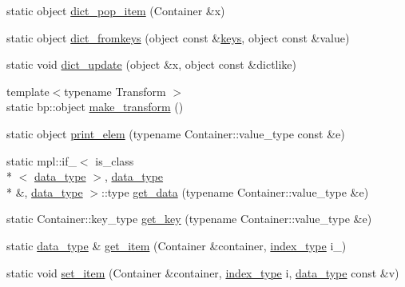 \begin{DoxyCompactItemize}
static object \hyperlink{classboost_1_1python_1_1std__map__indexing__suite_af207a28bb4d4a7fa8364139dd0484a84}{dict\-\_\-pop\-\_\-item} (Container \&x)
\item 
static object \hyperlink{classboost_1_1python_1_1std__map__indexing__suite_a8aedb678ae655adaf30a5f0200fdeda9}{dict\-\_\-fromkeys} (object const \&\hyperlink{classboost_1_1python_1_1std__map__indexing__suite_a1d08ce35eb71bc9248f64a515d6d9775}{keys}, object const \&value)
\item 
static void \hyperlink{classboost_1_1python_1_1std__map__indexing__suite_a77daf7a1f7b0da0d6035e91dfa118899}{dict\-\_\-update} (object \&x, object const \&dictlike)
\item 
{\footnotesize template$<$typename Transform $>$ }\\static bp\-::object \hyperlink{classboost_1_1python_1_1std__map__indexing__suite_ad2e6c20740dd4ad7058f04e958fc499c}{make\-\_\-transform} ()
\item 
static object \hyperlink{classboost_1_1python_1_1std__map__indexing__suite_a1147c134bf910497fb9a467a21522933}{print\-\_\-elem} (typename Container\-::value\-\_\-type const \&e)
\item 
static mpl\-::if\-\_\-$<$ is\-\_\-class\\*
$<$ \hyperlink{classboost_1_1python_1_1std__map__indexing__suite_a3e9a6a8b8ba34759cf0ba99fe5966041}{data\-\_\-type} $>$, \hyperlink{classboost_1_1python_1_1std__map__indexing__suite_a3e9a6a8b8ba34759cf0ba99fe5966041}{data\-\_\-type} \\*
\&, \hyperlink{classboost_1_1python_1_1std__map__indexing__suite_a3e9a6a8b8ba34759cf0ba99fe5966041}{data\-\_\-type} $>$\-::type \hyperlink{classboost_1_1python_1_1std__map__indexing__suite_a7c13569acfb66f1adb8d92c581091654}{get\-\_\-data} (typename Container\-::value\-\_\-type \&e)
\item 
static Container\-::key\-\_\-type \hyperlink{classboost_1_1python_1_1std__map__indexing__suite_a28a13c6039a1305e3605c6ca3a9803d9}{get\-\_\-key} (typename Container\-::value\-\_\-type \&e)
\item 
static \hyperlink{classboost_1_1python_1_1std__map__indexing__suite_a3e9a6a8b8ba34759cf0ba99fe5966041}{data\-\_\-type} \& \hyperlink{classboost_1_1python_1_1std__map__indexing__suite_a8650d42e8d1d7e095f6cfc9e664f0fab}{get\-\_\-item} (Container \&container, \hyperlink{classboost_1_1python_1_1std__map__indexing__suite_a4b2ac75883fba93dbca6d9e83197c842}{index\-\_\-type} i\-\_\-)
\item 
static void \hyperlink{classboost_1_1python_1_1std__map__indexing__suite_a5dc3dd492671db19152e7c64b62e9f97}{set\-\_\-item} (Container \&container, \hyperlink{classboost_1_1python_1_1std__map__indexing__suite_a4b2ac75883fba93dbca6d9e83197c842}{index\-\_\-type} i, \hyperlink{classboost_1_1python_1_1std__map__indexing__suite_a3e9a6a8b8ba34759cf0ba99fe5966041}{data\-\_\-type} const \&v)

\end{DoxyCompactItemize}
